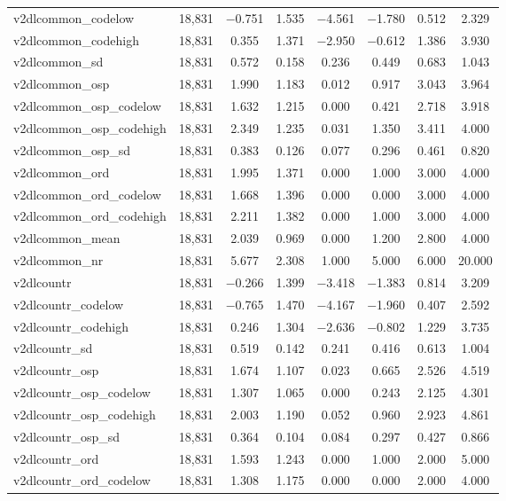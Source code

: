 \begin{table}[!htbp]
\begin{tabular}{@{\extracolsep{5pt}}lccccccc}
v2dlcommon\_codelow & 18,831 & $-$0.751 & 1.535 & $-$4.561 & $-$1.780 & 0.512 & 2.329 \\ 
v2dlcommon\_codehigh & 18,831 & 0.355 & 1.371 & $-$2.950 & $-$0.612 & 1.386 & 3.930 \\ 
v2dlcommon\_sd & 18,831 & 0.572 & 0.158 & 0.236 & 0.449 & 0.683 & 1.043 \\ 
v2dlcommon\_osp & 18,831 & 1.990 & 1.183 & 0.012 & 0.917 & 3.043 & 3.964 \\ 
v2dlcommon\_osp\_codelow & 18,831 & 1.632 & 1.215 & 0.000 & 0.421 & 2.718 & 3.918 \\ 
v2dlcommon\_osp\_codehigh & 18,831 & 2.349 & 1.235 & 0.031 & 1.350 & 3.411 & 4.000 \\ 
v2dlcommon\_osp\_sd & 18,831 & 0.383 & 0.126 & 0.077 & 0.296 & 0.461 & 0.820 \\ 
v2dlcommon\_ord & 18,831 & 1.995 & 1.371 & 0.000 & 1.000 & 3.000 & 4.000 \\ 
v2dlcommon\_ord\_codelow & 18,831 & 1.668 & 1.396 & 0.000 & 0.000 & 3.000 & 4.000 \\ 
v2dlcommon\_ord\_codehigh & 18,831 & 2.211 & 1.382 & 0.000 & 1.000 & 3.000 & 4.000 \\ 
v2dlcommon\_mean & 18,831 & 2.039 & 0.969 & 0.000 & 1.200 & 2.800 & 4.000 \\ 
v2dlcommon\_nr & 18,831 & 5.677 & 2.308 & 1.000 & 5.000 & 6.000 & 20.000 \\ 
v2dlcountr & 18,831 & $-$0.266 & 1.399 & $-$3.418 & $-$1.383 & 0.814 & 3.209 \\ 
v2dlcountr\_codelow & 18,831 & $-$0.765 & 1.470 & $-$4.167 & $-$1.960 & 0.407 & 2.592 \\ 
v2dlcountr\_codehigh & 18,831 & 0.246 & 1.304 & $-$2.636 & $-$0.802 & 1.229 & 3.735 \\ 
v2dlcountr\_sd & 18,831 & 0.519 & 0.142 & 0.241 & 0.416 & 0.613 & 1.004 \\ 
v2dlcountr\_osp & 18,831 & 1.674 & 1.107 & 0.023 & 0.665 & 2.526 & 4.519 \\ 
v2dlcountr\_osp\_codelow & 18,831 & 1.307 & 1.065 & 0.000 & 0.243 & 2.125 & 4.301 \\ 
v2dlcountr\_osp\_codehigh & 18,831 & 2.003 & 1.190 & 0.052 & 0.960 & 2.923 & 4.861 \\ 
v2dlcountr\_osp\_sd & 18,831 & 0.364 & 0.104 & 0.084 & 0.297 & 0.427 & 0.866 \\ 
v2dlcountr\_ord & 18,831 & 1.593 & 1.243 & 0.000 & 1.000 & 2.000 & 5.000 \\ 
v2dlcountr\_ord\_codelow & 18,831 & 1.308 & 1.175 & 0.000 & 0.000 & 2.000 & 4.000 \\ 

\end{tabular}
\end{table}
